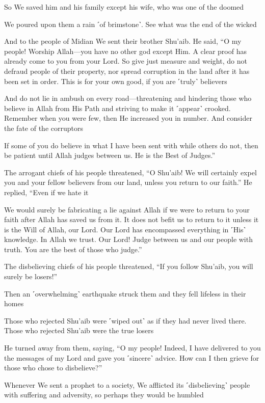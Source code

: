 So We saved him and his family except his wife, who was one of the doomed

We poured upon them a rain ˹of brimstone˺. See what was the end of the wicked

And to the people of Midian We sent their brother Shu’aib. He said, “O my people! Worship Allah—you have no other god except Him. A clear proof has already come to you from your Lord. So give just measure and weight, do not defraud people of their property, nor spread corruption in the land after it has been set in order. This is for your own good, if you are ˹truly˺ believers

And do not lie in ambush on every road—threatening and hindering those who believe in Allah from His Path and striving to make it ˹appear˺ crooked. Remember when you were few, then He increased you in number. And consider the fate of the corruptors

If some of you do believe in what I have been sent with while others do not, then be patient until Allah judges between us. He is the Best of Judges.”

The arrogant chiefs of his people threatened, “O Shu’aib! We will certainly expel you and your fellow believers from our land, unless you return to our faith.” He replied, “Even if we hate it

We would surely be fabricating a lie against Allah if we were to return to your faith after Allah has saved us from it. It does not befit us to return to it unless it is the Will of Allah, our Lord. Our Lord has encompassed everything in ˹His˺ knowledge. In Allah we trust. Our Lord! Judge between us and our people with truth. You are the best of those who judge.”

The disbelieving chiefs of his people threatened, “If you follow Shu’aib, you will surely be losers!”

Then an ˹overwhelming˺ earthquake struck them and they fell lifeless in their homes

Those who rejected Shu’aib were ˹wiped out˺ as if they had never lived there. Those who rejected Shu’aib were the true losers

He turned away from them, saying, “O my people! Indeed, I have delivered to you the messages of my Lord and gave you ˹sincere˺ advice. How can I then grieve for those who chose to disbelieve?”

Whenever We sent a prophet to a society, We afflicted its ˹disbelieving˺ people with suffering and adversity, so perhaps they would be humbled

